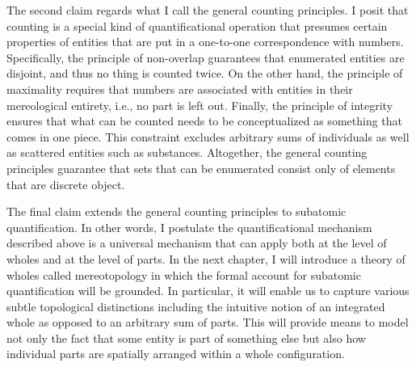 The second claim regards what I call the general counting principles. I posit that counting is a special kind of quantificational operation that presumes certain properties of entities that are put in a one-to-one correspondence with numbers. Specifically, the principle of non-overlap guarantees that enumerated entities are disjoint, and thus no thing is counted twice. On the other hand, the principle of maximality requires that numbers are associated with entities in their mereological entirety, i.e., no part is left out. Finally, the principle of integrity ensures that what can be counted needs to be conceptualized as something that comes in one piece. This constraint excludes arbitrary sums of individuals as well as scattered entities such as substances. Altogether, the general counting principles guarantee that sets that can be enumerated consist only of elements that are discrete object.

The final claim extends the general counting principles to subatomic quantification. In other words, I postulate the quantificational mechanism described above is a universal mechanism that can apply both at the level of wholes and at the level of parts. In the next chapter, I will introduce a theory of wholes called mereotopology in which the formal account for subatomic quantification will be grounded. In particular, it will enable us to capture various subtle topological distinctions including the intuitive notion of an integrated whole as opposed to an arbitrary sum of parts. This will provide means to model not only the fact that some entity is part of something else but also how individual parts are spatially arranged within a whole configuration.
